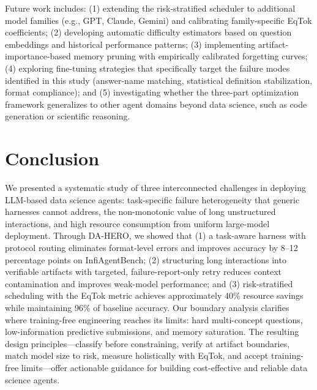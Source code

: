 \documentclass[letterpaper]{article} %
\begin{document}
Future work includes: (1) extending the risk-stratified scheduler to additional model families (e.g., GPT, Claude, Gemini) and calibrating family-specific EqTok coefficients; (2) developing automatic difficulty estimators based on question embeddings and historical performance patterns; (3) implementing artifact-importance-based memory pruning with empirically calibrated forgetting curves; (4) exploring fine-tuning strategies that specifically target the failure modes identified in this study (answer-name matching, statistical definition stabilization, format compliance); and (5) investigating whether the three-part optimization framework generalizes to other agent domains beyond data science, such as code generation or scientific reasoning.

\section{Conclusion}

We presented a systematic study of three interconnected challenges in deploying LLM-based data science agents: task-specific failure heterogeneity that generic harnesses cannot address, the non-monotonic value of long unstructured interactions, and high resource consumption from uniform large-model deployment. Through DA-HERO, we showed that (1) a task-aware harness with protocol routing eliminates format-level errors and improves accuracy by 8--12 percentage points on InfiAgentBench; (2) structuring long interactions into verifiable artifacts with targeted, failure-report-only retry reduces context contamination and improves weak-model performance; and (3) risk-stratified scheduling with the EqTok metric achieves approximately 40\% resource savings while maintaining 96\% of baseline accuracy. Our boundary analysis clarifies where training-free engineering reaches its limits: hard multi-concept questions, low-information predictive submissions, and memory saturation. The resulting design principles---classify before constraining, verify at artifact boundaries, match model size to risk, measure holistically with EqTok, and accept training-free limits---offer actionable guidance for building cost-effective and reliable data science agents.


\end{document}
